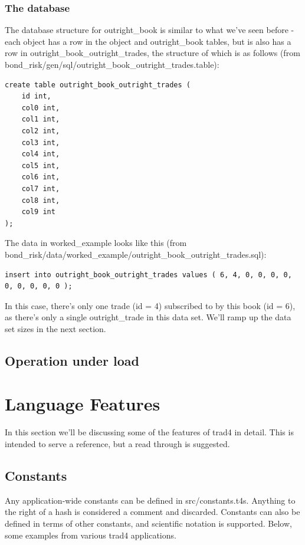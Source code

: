 \documentclass{report}
\begin{document}
\subsection{The database}

The database structure for outright_book is similar to what we've seen before - each object has a row in the object and outright_book tables, but is also has a row in outright_book_outright_trades, the structure of which is as follows (from bond_risk/gen/sql/outright_book_outright_trades.table):


\begin{verbatim}
create table outright_book_outright_trades (
    id int,
    col0 int,
    col1 int,
    col2 int,
    col3 int,
    col4 int,
    col5 int,
    col6 int,
    col7 int,
    col8 int,
    col9 int
);
\end{verbatim}

The data in worked_example looks like this (from bond_risk/data/worked_example/outright_book_outright_trades.sql):

\begin{verbatim}
insert into outright_book_outright_trades values ( 6, 4, 0, 0, 0, 0, 0, 0, 0, 0, 0 );
\end{verbatim}

In this case, there's only one trade (id = 4) subscribed to by this book (id = 6), as there's only a single outright_trade in this data set. We'll ramp up the data set sizes in the next section.

\section{Operation under load}





\chapter{Language Features}
\label{sec:Language Features}


In this section we'll be discussing some of the features of trad4 in detail. This is intended to serve a reference, but a read through is suggested.

\section{Constants}

Any application-wide constants can be defined in src/constants.t4s. Anything to the right of a hash is considered a comment and discarded. Constants can also be defined in terms of other constants, and scientific notation is supported. Below, some examples from various trad4 applications.
\end{document}
